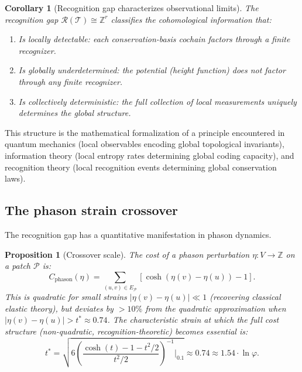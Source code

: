 \documentclass[12pt]{article}
\newtheorem{proposition}[theorem]{Proposition}
\newtheorem{corollary}[theorem]{Corollary}
\theoremstyle{definition}
\theoremstyle{remark}
\newcommand{\ZZ}{\mathbb{Z}}
\begin{document}
\begin{corollary}[Recognition gap characterizes observational limits]
\label{cor:observational}
The recognition gap $\mathcal{R}(\mathcal{T}) \cong \ZZ^r$ classifies the cohomological information that:
\begin{enumerate}
\item Is \emph{locally detectable}: each conservation-basis cochain factors through a finite recognizer.
\item Is \emph{globally underdetermined}: the potential (height function) does not factor through any finite recognizer.
\item Is \emph{collectively deterministic}: the full collection of local measurements uniquely determines the global structure.
\end{enumerate}
\end{corollary}

This structure is the mathematical formalization of a principle encountered in quantum mechanics (local observables encoding global topological invariants), information theory (local entropy rates determining global coding capacity), and recognition theory (local recognition events determining global conservation laws).

\subsection{The phason strain crossover}

The recognition gap has a quantitative manifestation in phason dynamics.

\begin{proposition}[Crossover scale]
\label{prop:crossover}
The cost of a phason perturbation $\eta: V \to \ZZ$ on a patch $\mathcal{P}$ is:
\[
C_{\mathrm{phason}}(\eta) = \sum_{(u,v) \in E_\mathcal{P}} \left[\cosh(\eta(v) - \eta(u)) - 1\right].
\]
This is quadratic for small strains $|\eta(v) - \eta(u)| \ll 1$ (recovering classical elastic theory), but deviates by $> 10\%$ from the quadratic approximation when $|\eta(v) - \eta(u)| > t^* \approx 0.74$. The characteristic strain at which the full cost structure (non-quadratic, recognition-theoretic) becomes essential is:
\begin{equation}
t^* = \sqrt{6\left(\frac{\cosh(t) - 1 - t^2/2}{t^2/2}\right)^{-1}\Big|_{0.1}} \approx 0.74 \approx 1.54 \cdot \ln \varphi.
\label{eq:crossover}
\end{equation}
\end{proposition}
\end{document}
